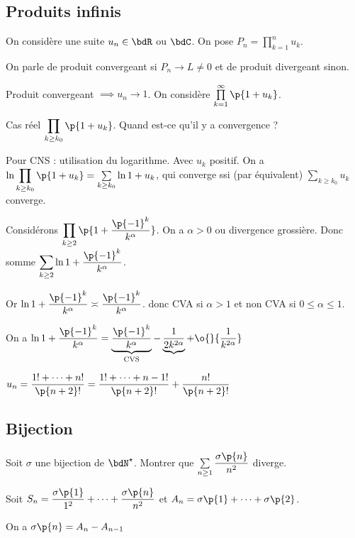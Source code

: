 \documentclass[a4paper,french,bookmarks]{book}
\begin{document}
    \subsection*{Produits infinis}
    
    On considère une suite $u_n \in \bdR$ ou $\bdC$. On pose $P_n = \prod\limits_{k=1}^n u_k$.
    
    On parle de produit convergeant si $P_n \to L \neq 0$ et de produit divergeant sinon.
    
    Produit convergeant $\implies u_n \to 1$. On considère $\prod\limits_{k=1}^\infty \p{1 + u_k}$.\bigskip
    
    Cas réel $\displaystyle\prod\limits_{k \geq k_0} \p{1 + u_k}$. Quand est-ce qu'il y a convergence ?
    
    Pour CNS : utilisation du logarithme. Avec $u_k$ positif. 
    On a $\ln{\displaystyle\prod\limits_{k \geq k_0} \p{1 + u_k}} = \sum\limits_{k \geq k_0} \ln{1 + u_k}$, qui converge ssi (par équivalent) $\displaystyle\sum\limits_{k \geq k_0} u_k$ converge.\bigskip
    
    Considérons $\displaystyle\prod\limits_{k \geq 2} \p{1 + \dfrac{\p{-1}^k}{k^\alpha}}$. On a $\alpha > 0$ ou divergence grossière. Donc somme $\displaystyle\sum_{k \geq 2} \ln{1 + \dfrac{\p{-1}^k}{k^\alpha}}$.
    
    Or $\ln{1 + \dfrac{\p{-1}^k}{k^\alpha}} \asymp \dfrac{\p{-1}^k}{k^\alpha}$. donc CVA si $\alpha > 1$ et non CVA si $0 \leq \alpha \leq 1$.
    
    On a $\ln{1 + \dfrac{\p{-1}^k}{k^\alpha}} = \underbrace{\dfrac{\p{-1}^k}{k^\alpha}}_{\text{CVS}} - \underbrace{\dfrac{1}{2k^{2\alpha}}} + \o{}{\dfrac{1}{k^{2\alpha}}}$ 
    
    
    $u_n = \dfrac{1! + \dots + n!}{\p{n+2}!} = \dfrac{1! + \dots + {n-1}!}{\p{n+2}!} + \dfrac{n!}{\p{n+2}!}$
    
    
    \subsection*{Bijection}
    
    Soit $\sigma$ une bijection de $\bdN^\star$. Montrer que $\sum\limits_{n \geq 1} \dfrac{\sigma\p{n}}{n^2}$ diverge.
    
    Soit $S_n = \dfrac{\sigma\p{1}}{1^2} + \dots + \dfrac{\sigma\p{n}}{n^2}$ et $A_n = \sigma\p{1} + \dots + \sigma\p{2}$.
    
    On a $\sigma\p{n} = A_n - A_{n-1}$
    
\end{document}
